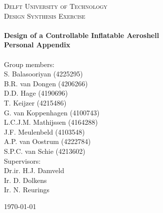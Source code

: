 \begin{titlepage}
\begin{center}

\textsc{\LARGE Delft University of Technology}\\[0.3cm]
\textsc{\Large Design Synthesis Exercise}\\[0.5cm]

\HRule \\[0.4cm]
{\Large \bfseries Design of a Controllable Inflatable Aeroshell}\\[0.2cm]
{\Huge \bfseries Personal Appendix}\\[0.2cm]
\HRule \\[9cm]


Group members: \\[0.2cm]
S. Balasooriyan (4225295) \\
B.R. van Dongen (4206266) \\
D.D. Hage (4190696) \\
T. Keijzer (4215486) \\
G. van Koppenhagen (4100743) \\
L.C.J.M. Mathijssen (4164288) \\
J.F. Meulenbeld (4103548) \\
A.P. van Oostrum (4222784) \\
S.P.C. van Schie (4213602) \\[0.5cm]

Supervisors: \\[0.2cm]
Dr.ir. H.J. Damveld \\
Ir. D. Dolkens \\
Ir. N. Reurings \\



\vfill

\begin{large}\today \end{large}

\end{center}
\end{titlepage}